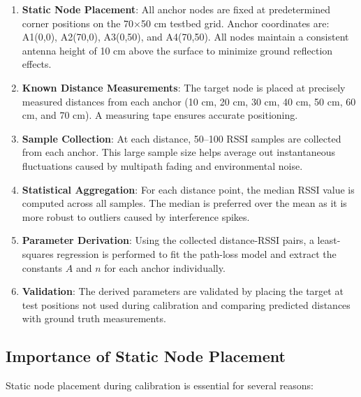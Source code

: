 \begin{enumerate}
    \item \textbf{Static Node Placement}: All anchor nodes are fixed at predetermined corner positions on the 70×50 cm testbed grid. Anchor coordinates are: A1(0,0), A2(70,0), A3(0,50), and A4(70,50). All nodes maintain a consistent antenna height of 10 cm above the surface to minimize ground reflection effects.
    
    \item \textbf{Known Distance Measurements}: The target node is placed at precisely measured distances from each anchor (10 cm, 20 cm, 30 cm, 40 cm, 50 cm, 60 cm, and 70 cm). A measuring tape ensures accurate positioning.
    
    \item \textbf{Sample Collection}: At each distance, 50--100 RSSI samples are collected from each anchor. This large sample size helps average out instantaneous fluctuations caused by multipath fading and environmental noise.
    
    \item \textbf{Statistical Aggregation}: For each distance point, the median RSSI value is computed across all samples. The median is preferred over the mean as it is more robust to outliers caused by interference spikes.
    
    \item \textbf{Parameter Derivation}: Using the collected distance-RSSI pairs, a least-squares regression is performed to fit the path-loss model and extract the constants $A$ and $n$ for each anchor individually.
    
    \item \textbf{Validation}: The derived parameters are validated by placing the target at test positions not used during calibration and comparing predicted distances with ground truth measurements.
\end{enumerate}

\subsection{Importance of Static Node Placement}

Static node placement during calibration is essential for several reasons:

